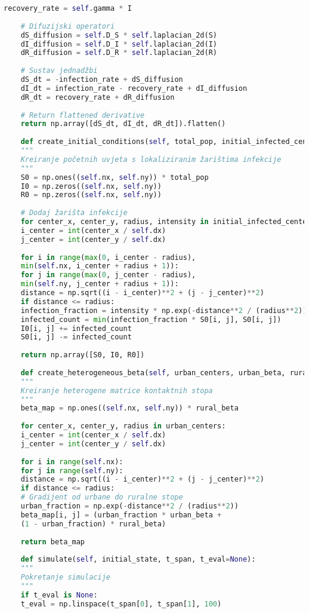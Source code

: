 \documentclass[11pt,oneside]{book}
\begin{document}
\begin{lstlisting}[language=Python, caption=SIR model s prostornom difuzijom]
	recovery_rate = self.gamma * I
	
	# Difuzijski operatori
	dS_diffusion = self.D_S * self.laplacian_2d(S)
	dI_diffusion = self.D_I * self.laplacian_2d(I)
	dR_diffusion = self.D_R * self.laplacian_2d(R)
	
	# Sustav jednadžbi
	dS_dt = -infection_rate + dS_diffusion
	dI_dt = infection_rate - recovery_rate + dI_diffusion
	dR_dt = recovery_rate + dR_diffusion
	
	# Return flattened derivative
	return np.array([dS_dt, dI_dt, dR_dt]).flatten()
	
	def create_initial_conditions(self, total_pop, initial_infected_centers):
	"""
	Kreiranje početnih uvjeta s lokaliziranim žarištima infekcije
	"""
	S0 = np.ones((self.nx, self.ny)) * total_pop
	I0 = np.zeros((self.nx, self.ny))
	R0 = np.zeros((self.nx, self.ny))
	
	# Dodaj žarišta infekcije
	for center_x, center_y, radius, intensity in initial_infected_centers:
	i_center = int(center_x / self.dx)
	j_center = int(center_y / self.dx)
	
	for i in range(max(0, i_center - radius), 
	min(self.nx, i_center + radius + 1)):
	for j in range(max(0, j_center - radius), 
	min(self.ny, j_center + radius + 1)):
	distance = np.sqrt((i - i_center)**2 + (j - j_center)**2)
	if distance <= radius:
	infection_fraction = intensity * np.exp(-distance**2 / (radius**2))
	infected_count = min(infection_fraction * S0[i, j], S0[i, j])
	I0[i, j] += infected_count
	S0[i, j] -= infected_count
	
	return np.array([S0, I0, R0])
	
	def create_heterogeneous_beta(self, urban_centers, urban_beta, rural_beta):
	"""
	Kreiranje heterogene matrice kontaktnih stopa
	"""
	beta_map = np.ones((self.nx, self.ny)) * rural_beta
	
	for center_x, center_y, radius in urban_centers:
	i_center = int(center_x / self.dx)
	j_center = int(center_y / self.dx)
	
	for i in range(self.nx):
	for j in range(self.ny):
	distance = np.sqrt((i - i_center)**2 + (j - j_center)**2)
	if distance <= radius:
	# Gradijent od urbane do ruralne stope
	urban_fraction = np.exp(-distance**2 / (radius**2))
	beta_map[i, j] = (urban_fraction * urban_beta + 
	(1 - urban_fraction) * rural_beta)
	
	return beta_map
	
	def simulate(self, initial_state, t_span, t_eval=None):
	"""
	Pokretanje simulacije
	"""
	if t_eval is None:
	t_eval = np.linspace(t_span[0], t_span[1], 100)
	

\end{lstlisting}
\end{document}
